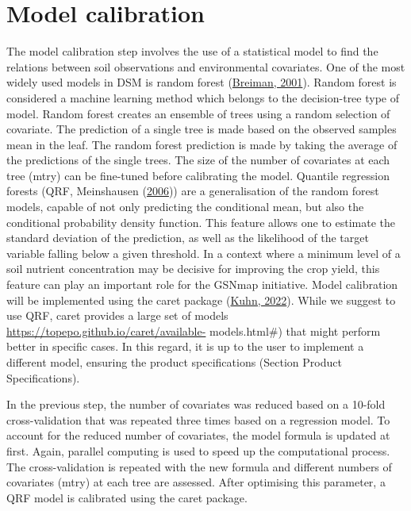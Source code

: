 \documentclass[
  10pt,
  b5paper,
  oneside]{book}
\begin{document}
\hypertarget{model-calibration}{%
\section{Model calibration}\label{model-calibration}}

The model calibration step involves the use of a statistical model to find the relations between soil observations and environmental covariates. One of the most widely used models in DSM is random forest (\protect\hyperlink{ref-Breiman2001}{Breiman, 2001}). Random forest is considered a machine learning method which belongs to the decision-tree type of model. Random forest creates an ensemble of trees using a random selection of covariate. The prediction of a single tree is made based on the observed samples mean in the leaf. The random forest prediction is made by taking the average of the predictions of the single trees. The size of the number of covariates at each tree (mtry) can be fine-tuned before calibrating the model.
Quantile regression forests (QRF, Meinshausen (\protect\hyperlink{ref-Meinshausen2006}{2006})) are a generalisation of the random forest models, capable of not only predicting the conditional mean, but also the conditional probability density function. This feature allows one to estimate the standard deviation of the prediction, as well as the likelihood of the target variable falling below a given threshold. In a context where a minimum level of a soil nutrient concentration may be decisive for improving the crop yield, this feature can play an important role for the GSNmap initiative.
Model calibration will be implemented using the caret package (\protect\hyperlink{ref-Kuhn2022}{Kuhn, 2022}). While we suggest to use QRF, caret provides a large set of models \url{https://topepo.github.io/caret/available-} models.html\#) that might perform better in specific cases. In this regard, it is up to the user to implement a different model, ensuring the product specifications (Section Product Specifications).

In the previous step, the number of covariates was reduced based on a 10-fold cross-validation that was repeated three times based on a regression model. To account for the reduced number of covariates, the model formula is updated at first.
Again, parallel computing is used to speed up the computational process.
The cross-validation is repeated with the new formula and different numbers of covariates (mtry) at each tree are assessed. After optimising this parameter, a QRF model is calibrated using the caret package.
\end{document}
